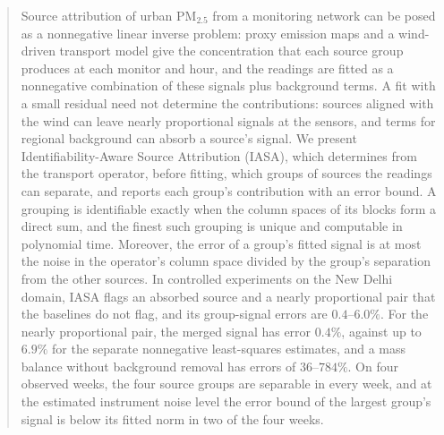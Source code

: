\begin{abstract}
\sloppy
Source attribution of urban PM\(_{2.5}\) from a monitoring network can be posed as a
nonnegative linear inverse problem: proxy emission maps and a wind-driven transport
model give the concentration that each source group produces at each monitor and hour,
and the readings are fitted as a nonnegative combination of these signals plus
background terms.  A fit with a small residual need not determine the contributions: sources aligned with the wind can leave nearly proportional signals at
the sensors, and terms for regional background can absorb a source's signal.  We
present Identifiability-Aware Source Attribution (IASA), which determines from the
transport operator, before fitting, which groups of sources the readings can separate,
and reports each group's contribution with an error bound.  A grouping is identifiable
exactly when the column spaces of its blocks form a direct sum, and the finest such
grouping is unique and computable in polynomial time.  Moreover, the error of a group's
fitted signal is at most the noise in the operator's column space divided by the
group's separation from the other sources.  In controlled experiments on the New Delhi domain,
IASA flags an absorbed source and a nearly proportional pair that the baselines do not
flag, and its group-signal errors are \(0.4\)--\(6.0\%\).  For the nearly proportional
pair, the merged signal has error \(0.4\%\), against up to \(6.9\%\) for the separate
nonnegative least-squares estimates, and a mass balance without background removal has
errors of \(36\)--\(784\%\).
On four observed weeks, the four source groups are separable in every week, and at the
estimated instrument noise level the error bound of the largest group's signal is below
its fitted norm in two of the four weeks.
\end{abstract}
